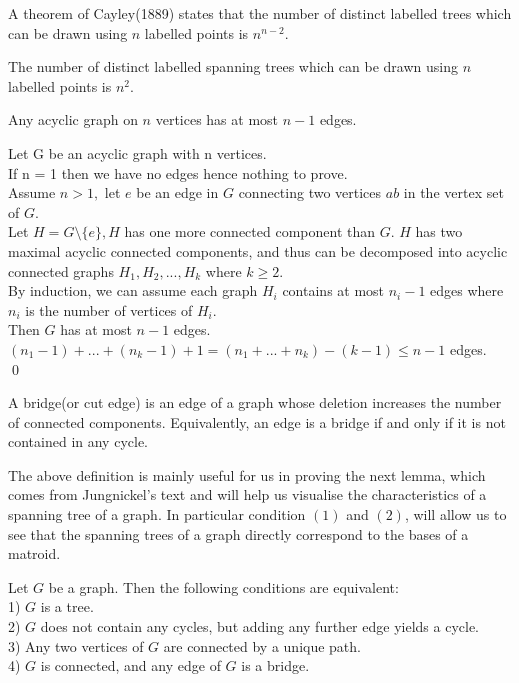 \documentclass[../main.tex]{subfiles}
\begin{document}
\begin{prop}
 A theorem of Cayley(1889) states that the number of distinct labelled trees which can be drawn using $n$ labelled points is $ n^{n-2}$.
 \end{prop}

\begin{cor}
The number of distinct labelled spanning trees which can be drawn using $n$ labelled points is $n^2.$ 
\end{cor}

\pagebreak
\begin{lem}\cite{jungnickel}
Any acyclic graph on $n$ vertices has at most $n-1$ edges.
\end{lem}
\noindent\Proof Let G be an acyclic graph with n vertices.\\
\noindent If n = 1 then we have no edges hence nothing to prove.\\
\noindent Assume $n>1,$ let $e$ be an edge in $G$ connecting two vertices $ab$ in the vertex set of $G.$\\
\noindent Let $H = G \setminus \{e\}, H$ has one more connected component than $G.$ $H$ has two maximal acyclic connected components, and thus can be decomposed into acyclic connected graphs $H_1, H_2, ..., H_k$ where $k \geq 2.$\\
\noindent By induction, we can assume each graph $H_i$ contains at most $n_i - 1$ edges where $n_i$ is the number of vertices of $H_i.$\\
\noindent Then $G$ has at most $n-1$ edges.\\
\noindent $(n_1 - 1) + ... + (n_k - 1) + 1 = (n_1 + ... + n_k) - (k - 1) \leq n - 1$ edges.
\\ \qed

\begin{defn}[Bridge]
A bridge(or cut edge) is an edge of a graph whose deletion increases the number of connected components. Equivalently, an edge is a bridge if and only if it is not contained in any cycle.
\end{defn}

\noindent The above definition is mainly useful for us in proving the next lemma, which comes from Jungnickel's text and will help us visualise the characteristics of a spanning tree of a graph. In particular condition $(1)$ and $(2)$, will allow us to see that the spanning trees of a graph directly correspond to the bases of a matroid.

 \begin{lem}\cite{jungnickel}
 Let $G$ be a graph. Then the following conditions are equivalent:\\
 1) $G$ is a tree.\\
 2) $G$ does not contain any cycles, but adding any further edge yields a cycle.\\
 3) Any two vertices of $G$ are connected by a unique path.\\
 4) $G$ is connected, and any edge of $G$ is a bridge.
 \end{lem}
 
\end{document}
